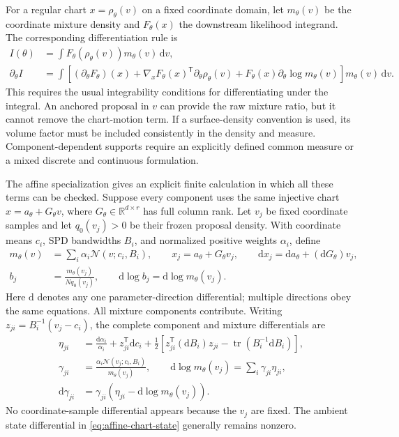 \documentclass[11pt]{article}
\newcommand{\R}{\mathbb{R}}
\newcommand{\dd}{\mathrm{d}}
\begin{document}
For a regular chart $x=\rho_\theta(v)$ on a fixed coordinate domain, let
$m_\theta(v)$ be the coordinate mixture density and $F_\theta(x)$ the
downstream likelihood integrand.  The corresponding differentiation rule is
\begin{align}
 I(\theta)&=\int F_\theta(\rho_\theta(v))m_\theta(v)\,\dd v,\\
 \partial_\theta I
 &=\int\!\left[
   (\partial_\theta F_\theta)(x)
   +\nabla_xF_\theta(x)^\mathsf{T}\partial_\theta\rho_\theta(v)
   +F_\theta(x)\partial_\theta\log m_\theta(v)
   \right]m_\theta(v)\,\dd v.
 \label{eq:chart-total-expectation}
\end{align}
This requires the usual integrability conditions for differentiating under
the integral.  An anchored proposal in $v$ can provide the raw mixture ratio,
but it cannot remove the chart-motion term.  If a surface-density convention
is used, its volume factor must be included consistently in the density and
measure.  Component-dependent supports require an explicitly defined common
measure or a mixed discrete and continuous formulation.

The affine specialization gives an explicit finite calculation in which all
these terms can be checked.  Suppose every component uses the same injective
chart $x=a_\theta+G_\theta v$, where $G_\theta\in\R^{d\times r}$ has full
column rank.  Let $v_j$ be fixed coordinate samples and let $q_0(v_j)>0$
be their frozen proposal density.  With coordinate means $c_i$, SPD
bandwidths $B_i$, and normalized positive weights $\alpha_i$, define
\begin{align}
 m_\theta(v)&=\sum_i\alpha_i\mathcal N(v;c_i,B_i),\qquad
 x_j=a_\theta+G_\theta v_j,\qquad
 \dd x_j=\dd a_\theta+(\dd G_\theta)v_j,
 \label{eq:affine-chart-state}\\
 b_j&=\frac{m_\theta(v_j)}{Nq_0(v_j)},\qquad
 \dd\log b_j=\dd\log m_\theta(v_j).
 \label{eq:affine-chart-iwsg}
\end{align}
Here $\dd$ denotes any one parameter-direction differential; multiple
directions obey the same equations.  All mixture components contribute.
Writing $z_{ji}=B_i^{-1}(v_j-c_i)$, the complete component and mixture
differentials are
\begin{align}
 \eta_{ji}&=\frac{\dd\alpha_i}{\alpha_i}
       +z_{ji}^{\mathsf T}\dd c_i
       +\frac12\left[z_{ji}^{\mathsf T}(\dd B_i)z_{ji}
                     -\operatorname{tr}(B_i^{-1}\dd B_i)\right],\\
 \gamma_{ji}&=\frac{\alpha_i\mathcal N(v_j;c_i,B_i)}{m_\theta(v_j)},\qquad
 \dd\log m_\theta(v_j)=\sum_i\gamma_{ji}\eta_{ji},\\
 \dd\gamma_{ji}&=\gamma_{ji}
                  \left(\eta_{ji}-\dd\log m_\theta(v_j)\right).
 \label{eq:affine-chart-mixture-differential}
\end{align}
No coordinate-sample differential appears because the $v_j$ are fixed.
The ambient state differential in \eqref{eq:affine-chart-state} generally
remains nonzero.
\end{document}
